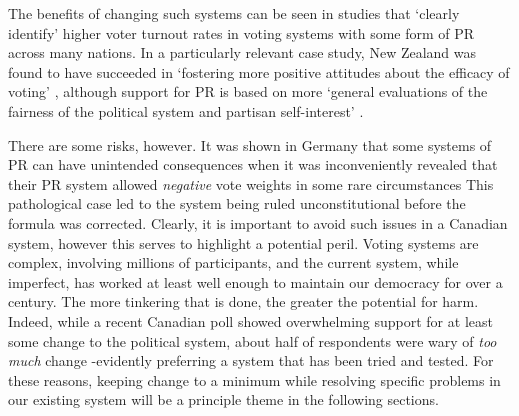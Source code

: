 

The benefits of changing such systems can be seen in studies that `clearly identify' higher voter turnout rates in voting systems with some form of PR\cite{Blais_1990}
 across many nations. In a particularly relevant case study, New Zealand was found to have succeeded in `fostering more positive attitudes about the efficacy of voting' \cite{Karp_Banducci}, although support for PR is based on more `general evaluations of the fairness of the political system and partisan self-interest' \cite{Banducci_Karp} .

There are some risks, however. It was shown in Germany that some systems of PR can have unintended consequences when it was inconveniently revealed that their PR system allowed \emph{negative} vote weights in some rare circumstances\cite{Die_Zeit_negative_vote}
This pathological case led to the system being ruled unconstitutional before the formula was corrected.
Clearly, it is important to avoid such issues in a Canadian system, however this serves to highlight a potential peril.
Voting systems are complex, involving millions of participants, and the current system, while imperfect, has worked at least well enough to maintain our democracy for over a century.
The more tinkering that is done, the greater the potential for harm.
Indeed, while a recent Canadian poll\cite{Broadbent_poll} showed overwhelming support for at least some change to the political system, about half of respondents were wary of \emph{too much} change \--evidently preferring a system that has been tried and tested.
For these reasons, keeping change to a minimum while resolving specific problems in our existing system will be a principle theme in the following sections.


